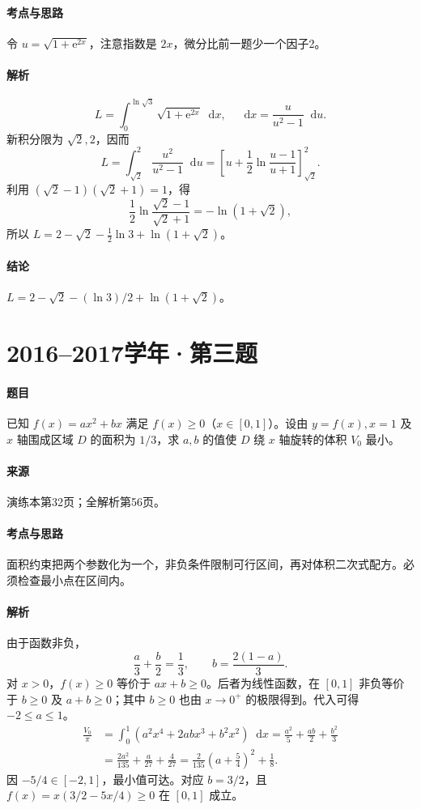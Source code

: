 \documentclass[UTF8,fontset=fandol,12pt,oneside,openany]{ctexrep}
\newcommand{\dd}{\mathop{}\!\mathrm d}
\newcommand{\ee}{\mathrm e}
\theoremstyle{definition}
\begin{document}
\paragraph{考点与思路}令 $u=\sqrt{1+\ee^{2x}}$，注意指数是 $2x$，微分比前一题少一个因子2。
\paragraph{解析}
\[
 L=\int_0^{\ln\sqrt3}\sqrt{1+\ee^{2x}}\dd x,
 \quad \dd x=\frac{u}{u^2-1}\dd u.
\]
新积分限为 $\sqrt2,2$，因而
\[
 L=\int_{\sqrt2}^2\frac{u^2}{u^2-1}\dd u
 =\left[u+\frac12\ln\frac{u-1}{u+1}\right]_{\sqrt2}^2.
\]
利用 $(\sqrt2-1)(\sqrt2+1)=1$，得
\[
 \frac12\ln\frac{\sqrt2-1}{\sqrt2+1}=-\ln(1+\sqrt2),
\]
所以 $L=2-\sqrt2-\frac12\ln3+\ln(1+\sqrt2)$。
\paragraph{结论}$L=2-\sqrt2-(\ln3)/2+\ln(1+\sqrt2)$。

\par\addvspace{18pt}\noindent\begin{minipage}{\linewidth}
\section{2016--2017学年·第三题}
\paragraph{题目}已知 $f(x)=ax^2+bx$ 满足 $f(x)\ge0$（$x\in[0,1]$）。设由 $y=f(x),x=1$ 及 $x$ 轴围成区域 $D$ 的面积为 $1/3$，求 $a,b$ 的值使 $D$ 绕 $x$ 轴旋转的体积 $V_0$ 最小。
\paragraph{来源}演练本第32页；全解析第56页。
\end{minipage}\par
\paragraph{考点与思路}面积约束把两个参数化为一个，非负条件限制可行区间，再对体积二次式配方。必须检查最小点在区间内。
\paragraph{解析}由于函数非负，
\[
 \frac a3+\frac b2=\frac13,\qquad b=\frac{2(1-a)}3.
\]
对 $x>0$，$f(x)\ge0$ 等价于 $ax+b\ge0$。后者为线性函数，在 $[0,1]$ 非负等价于 $b\ge0$ 及 $a+b\ge0$；其中 $b\ge0$ 也由 $x\to0^+$ 的极限得到。代入可得 $-2\le a\le1$。
\begin{align*}
 \frac{V_0}\pi&=\int_0^1(a^2x^4+2abx^3+b^2x^2)\dd x
 =\frac{a^2}{5}+\frac{ab}{2}+\frac{b^2}{3}\\
 &=\frac{2a^2}{135}+\frac a{27}+\frac4{27}
 =\frac2{135}\left(a+\frac54\right)^2+\frac18.
\end{align*}
因 $-5/4\in[-2,1]$，最小值可达。对应 $b=3/2$，且
$f(x)=x(3/2-5x/4)\ge0$ 在 $[0,1]$ 成立。
\end{document}
